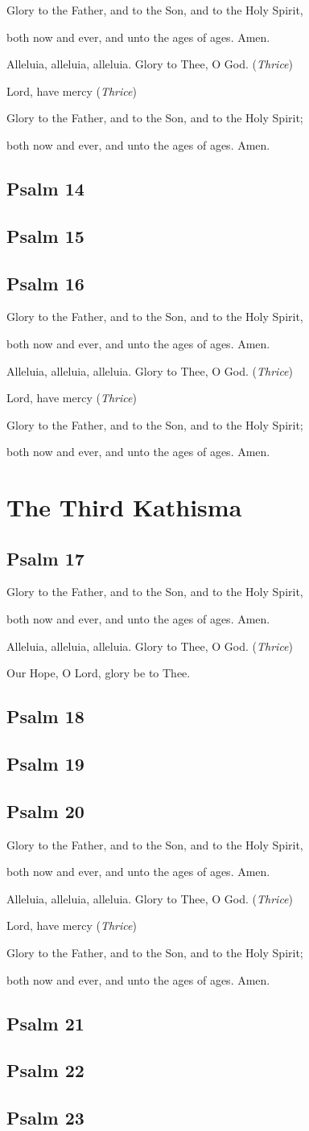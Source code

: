\documentclass[12pt,openany]{book}
\newcommand{\kathismabreak}{
  \medskip
  \begin{center}
  \begin{footnotesize}
  Glory to the Father, and to the Son, and to the Holy Spirit,
  
  both now and ever, and unto the ages of ages. Amen.

  Alleluia, alleluia, alleluia. Glory to Thee, O God. (\textit{Thrice})

  Lord, have mercy (\textit{Thrice})

  Glory to the Father, and to the Son, and to the Holy Spirit;
  
  both now and ever, and unto the ages of ages. Amen.
  \end{footnotesize}
  \end{center}
  \smallbreak
}
\newcommand{\kathismaend}{
  \medskip
  \begin{center}
  \begin{footnotesize}
  Glory to the Father, and to the Son, and to the Holy Spirit,
  
  both now and ever, and unto the ages of ages. Amen.

  Alleluia, alleluia, alleluia. Glory to Thee, O God. (\textit{Thrice})

  Our Hope, O Lord, glory be to Thee.
  \end{footnotesize}
  \end{center}
  \smallbreak
}
\begin{document}
\kathismabreak
\section{Psalm 14}

\smallskip
\section{Psalm 15}

\smallskip
\section{Psalm 16}


\kathismabreak

\chapter*{The Third Kathisma}
\smallskip
\section{Psalm 17}


\kathismaend
\smallskip
\section{Psalm 18}

\smallskip

\section{Psalm 19}

\smallskip
\section{Psalm 20}


\kathismabreak
\smallskip
\section{Psalm 21}

\smallskip
\section{Psalm 22}

\smallskip
\section{Psalm 23}

\end{document}
